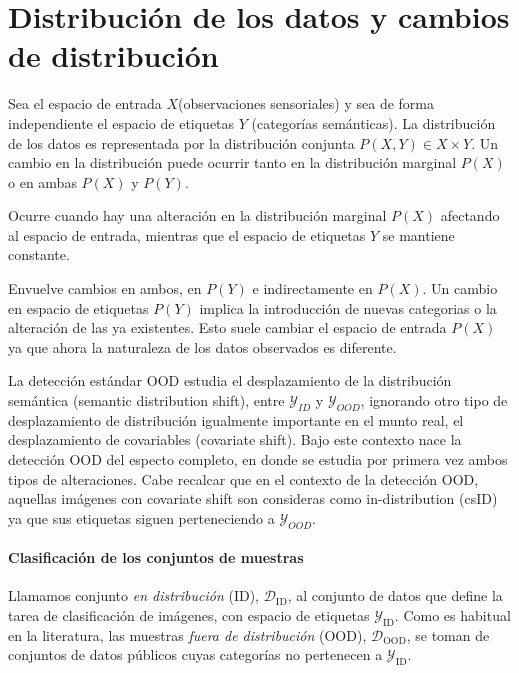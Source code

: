 \section{Distribución de los datos y cambios de distribución}\label{sec:cambios-distribucion}

Sea el espacio de entrada $X$(observaciones sensoriales) y sea de forma independiente el espacio de etiquetas $Y$ (categorías semánticas). La distribución
de los datos es representada por la distribución conjunta $P(X,Y) \in X \times Y$. Un cambio en la distribución puede ocurrir tanto en la distribución marginal
$P(X)$ o en ambas $P(X)$ y $P(Y)$.
\begin{definicion}\label{def:covariate-shift}
Ocurre cuando hay una alteración en la distribución marginal $P(X)$ afectando al espacio de entrada, mientras que el espacio de etiquetas $Y$ se mantiene constante.
\end{definicion}

\begin{definicion}\label{def:semantic-shift}
    Envuelve cambios en ambos, en $P(Y)$ e indirectamente en $P(X)$. Un cambio en espacio de etiquetas $P(Y)$ implica la introducción de nuevas categorias o la alteración de las 
    ya existentes. Esto suele cambiar el espacio de entrada $P(X)$ ya que ahora la naturaleza de los datos observados es diferente.
\end{definicion}

\begin{definicion}\label{def:deteccionfullspectrum}
    La detección estándar OOD estudia el desplazamiento de la distribución semántica (semantic distribution shift), entre $\mathcal{Y}_{ID}$ y $\mathcal{Y}_{OOD}$, ignorando otro tipo
    de desplazamiento de distribución igualmente importante en el munto real, el desplazamiento de covariables (covariate shift). Bajo este contexto nace
    la detección OOD del especto completo, en donde se estudia por primera vez ambos tipos de alteraciones. Cabe recalcar que en el contexto 
    de la detección OOD, aquellas imágenes con covariate shift  son consideras como in-distribution (csID) ya que sus etiquetas siguen perteneciendo a $\mathcal{Y}_{OOD}$.
\end{definicion}

\paragraph{Clasificación de los conjuntos de muestras}
Llamamos conjunto \emph{en distribución} (ID), $\mathcal{D}_{\mathrm{ID}}$, al conjunto de datos que define la tarea de clasificación de imágenes, con espacio de etiquetas
 $\mathcal{Y}_{\mathrm{ID}}$. Como es habitual en la literatura, las muestras \emph{fuera de distribución} (OOD), $\mathcal{D}_{\mathrm{OOD}}$, se toman de conjuntos de datos
  públicos cuyas categorías no pertenecen a $\mathcal{Y}_{\mathrm{ID}}$.


